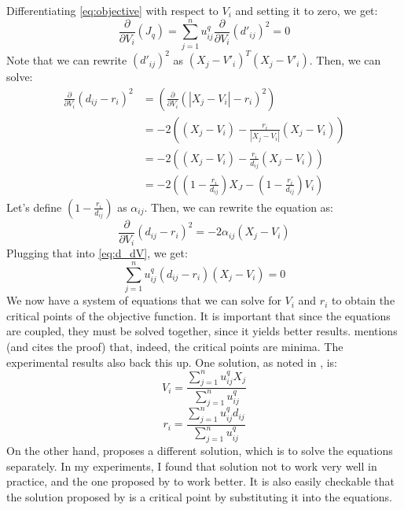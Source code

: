 \documentclass[conference]{IEEEtran}
\begin{document}
Differentiating \eqref{eq:objective} with respect to $V_i$ and setting it to zero, we get:
\begin{equation}\label{eq:d_dV}
\frac{\partial}{\partial V_i}(J_q) = \sum_{j=1}^{n} u_{ij}^q\frac{\partial}{\partial V_i} (d'_{ij})^2 = 0
\end{equation}
Note that we can rewrite $(d'_{ij})^2$ as $(X_j - V'_i)^T(X_j - V'_i)$.
Then, we can solve:
\begin{equation}
\begin{aligned}
\frac{\partial}{\partial V_i} (d_{ij} - r_i)^2 &= \left(\frac{\partial}{\partial V_i} (|X_j - V_i| - r_i)^2\right) \\
&= -2 \left( (X_j - V_i) - \frac{r_i}{|X_j - V_i|} (X_j - V_i) \right) \\
&= -2 \left( (X_j - V_i) - \frac{r_i}{d_{ij}} (X_j - V_i) \right) \\
&= -2 \left( (1 - \frac{r_i}{d_{ij}})X_J - (1 - \frac{r_i}{d_{ij}})V_i \right)
\end{aligned}
\end{equation}
Let's define $(1 - \frac{r_i}{d_{ij}})$ as $\alpha_{ij}$.
Then, we can rewrite the equation as:
\begin{equation}
\frac{\partial}{\partial V_i} (d_{ij} - r_i)^2 = -2 \alpha_{ij} (X_j - V_i)
\end{equation}
Plugging that into \eqref{eq:d_dV}, we get:
\begin{equation}
\sum_{j=1}^{n} u_{ij}^q (d_{ij} - r_i) (X_j - V_i) = 0
\end{equation}
We now have a system of equations that we can solve for $V_i$ and $r_i$ to obtain the critical points of the objective function. It is important that since
the equations are coupled, they must be solved together, since it yields better results. \cite{DAVE1992713} mentions (and cites the proof) that, indeed, the critical
points are minima. The experimental results also back this up.
One solution, as noted in \cite{DAVE1992713}, is:
\begin{equation}
V_i = \frac{\sum_{j=1}^{n} u_{ij}^q X_j}{\sum_{j=1}^{n} u_{ij}^q}
\end{equation}
\begin{equation}\label{eq:r_i}
r_i = \frac{\sum_{j=1}^{n} u_{ij}^q d_{ij}}{\sum_{j=1}^{n} u_{ij}^q}
\end{equation}
On the other hand, \cite{308484} proposes a different solution, which is to solve the equations separately. In my experiments, I found that solution not to work very
well in practice, and the one proposed by \cite{DAVE1992713} to work better.
It is also easily checkable that the solution proposed by \cite{DAVE1992713} is a critical point by substituting it into the equations.
\end{document}
